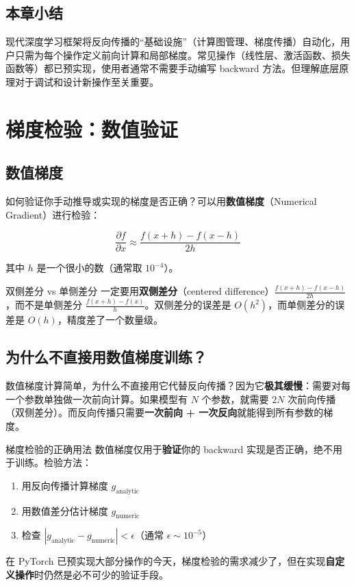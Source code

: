 \documentclass[a4paper]{article}
\begin{document}
\subsection{本章小结}

现代深度学习框架将反向传播的``基础设施''（计算图管理、梯度传播）自动化，用户只需为每个操作定义前向计算和局部梯度。常见操作（线性层、激活函数、损失函数等）都已预实现，使用者通常不需要手动编写 backward 方法。但理解底层原理对于调试和设计新操作至关重要。


\section{梯度检验：数值验证}

\subsection{数值梯度}

如何验证你手动推导或实现的梯度是否正确？可以用\textbf{数值梯度}（Numerical Gradient）进行检验：

$$\frac{\partial f}{\partial x} \approx \frac{f(x + h) - f(x - h)}{2h}$$

其中 $h$ 是一个很小的数（通常取 $10^{-4}$）。





\begin{warningbox}{双侧差分 vs 单侧差分}
一定要用\textbf{双侧差分}（centered difference）$\frac{f(x+h) - f(x-h)}{2h}$，而不是单侧差分 $\frac{f(x+h) - f(x)}{h}$。双侧差分的误差是 $O(h^2)$，而单侧差分的误差是 $O(h)$，精度差了一个数量级。
\end{warningbox}

\subsection{为什么不直接用数值梯度训练？}

数值梯度计算简单，为什么不直接用它代替反向传播？因为它\textbf{极其缓慢}：需要对每一个参数单独做一次前向计算。如果模型有 $N$ 个参数，就需要 $2N$ 次前向传播（双侧差分）。而反向传播只需要\textbf{一次前向 + 一次反向}就能得到所有参数的梯度。

\begin{importantbox}{梯度检验的正确用法}
数值梯度仅用于\textbf{验证}你的 backward 实现是否正确，绝不用于训练。检验方法：
\begin{enumerate}
    \item 用反向传播计算梯度 $g_{\text{analytic}}$
    \item 用数值差分估计梯度 $g_{\text{numeric}}$
    \item 检查 $|g_{\text{analytic}} - g_{\text{numeric}}| < \epsilon$（通常 $\epsilon \sim 10^{-5}$）
\end{enumerate}
在 PyTorch 已预实现大部分操作的今天，梯度检验的需求减少了，但在实现\textbf{自定义操作}时仍然是必不可少的验证手段。
\end{importantbox}
\end{document}
